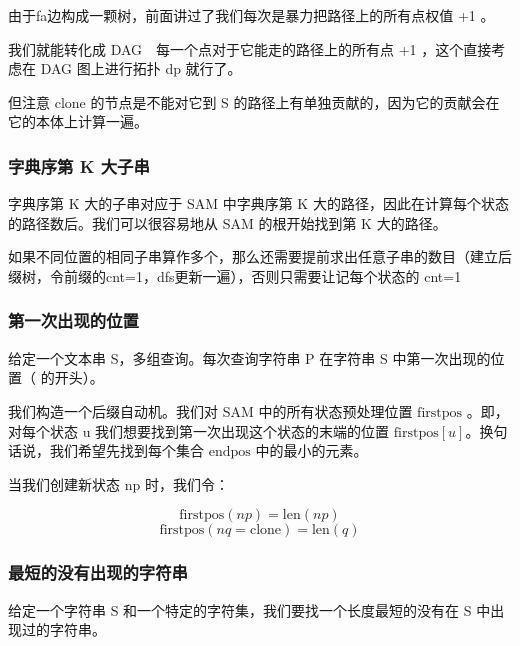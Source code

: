 \par \noindent 由于fa边构成一颗树，前面讲过了我们每次是暴力把路径上的所有点权值 +1 。
\par \noindent 我们就能转化成 DAG　每一个点对于它能走的路径上的所有点 +1 ，这个直接考虑在 DAG 图上进行拓扑 dp 就行了。
~\\
\par \noindent 但注意 $\text{clone}$ 的节点是不能对它到 S 的路径上有单独贡献的，因为它的贡献会在它的本体上计算一遍。
\subsubsection{字典序第 K 大子串}

\par \noindent 字典序第 K 大的子串对应于 SAM 中字典序第 K 大的路径，因此在计算每个状态的路径数后。我们可以很容易地从 SAM 的根开始找到第 K 大的路径。
~\\
\par \noindent 如果不同位置的相同子串算作多个，那么还需要提前求出任意子串的数目（建立后缀树，令前缀的cnt=1，dfs更新一遍），否则只需要让记每个状态的 cnt=1
\subsubsection{第一次出现的位置}

\begin{tcolorbox}
给定一个文本串 S，多组查询。每次查询字符串 P 在字符串 S 中第一次出现的位置（ 的开头）。
\end{tcolorbox}
\par \noindent 我们构造一个后缀自动机。我们对 SAM 中的所有状态预处理位置 $\text{firstpos}$ 。即，对每个状态 u 我们想要找到第一次出现这个状态的末端的位置 $\text{firstpos}[u]$。换句话说，我们希望先找到每个集合 $\text{endpos}$ 中的最小的元素。
~\\
\par \noindent 当我们创建新状态 np 时，我们令：

$$
\text{firstpos}(np)=\text{len}(np)
$$
$$
\text{firstpos}(nq=\text{clone})=\text{len}(q)
$$
\subsubsection{最短的没有出现的字符串}

\begin{tcolorbox}
给定一个字符串 S 和一个特定的字符集，我们要找一个长度最短的没有在 S 中出现过的字符串。
\end{tcolorbox}

